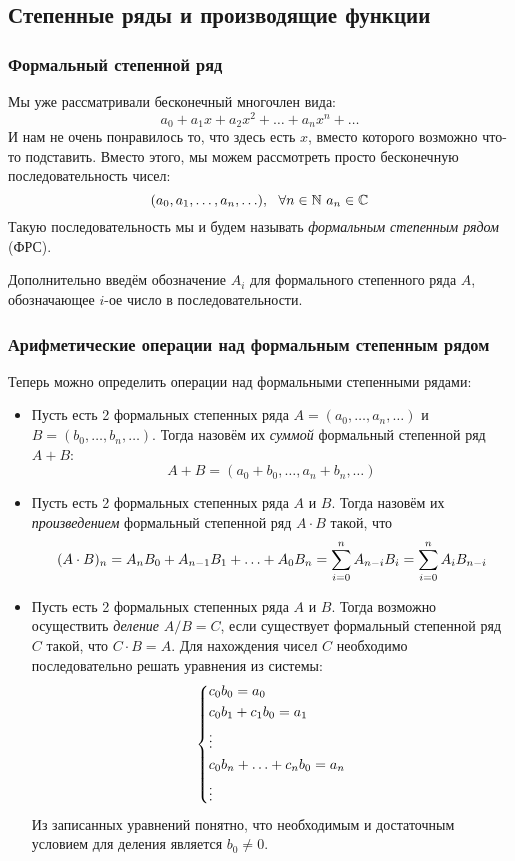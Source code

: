 \subsection{Степенные ряды и производящие функции}

\subsubsection*{Формальный степенной ряд}

\begin{definition}
	Мы уже рассматривали бесконечный многочлен вида:
	\[
		a_0 + a_1 x + a_2 x^2 + \ldots + a_n x^n + \ldots
	\]
	И нам не очень понравилось то, что здесь есть $x$, вместо которого возможно что-то подставить. Вместо этого, мы можем рассмотреть просто бесконечную последовательность чисел:
	\[
		(a_0, a_1, \ldots, a_n, \ldots),\ \ \forall n \in \mathbb{N}\ a_n \in \mathbb{C}
	\]
	Такую последовательность мы и будем называть \textit{формальным степенным рядом} (ФРС).
	
	Дополнительно введём обозначение $A_i$ для формального степенного ряда $A$, обозначающее $i$-ое число в последовательности.
\end{definition}

\subsubsection*{Арифметические операции над формальным степенным рядом}

Теперь можно определить операции над формальными степенными рядами:
\begin{itemize}
	\item Пусть есть 2 формальных степенных ряда $A = (a_0, \ldots, a_n, \ldots)$ и $B = (b_0, \ldots, b_n, \ldots)$. Тогда назовём их \textit{суммой} формальный степенной ряд $A + B$:
	\[
		A + B = (a_0 + b_0, \ldots, a_n + b_n, \ldots)
	\]
	
	\item Пусть есть 2 формальных степенных ряда $A$ и $B$. Тогда назовём их \textit{произведением} формальный степенной ряд $A \cdot B$ такой, что
	\[
		(A \cdot B)_n = A_nB_0 + A_{n - 1}B_{1} + \ldots + A_0B_n = \sum\limits_{i = 0}^n A_{n - i}B_i = \sum\limits_{i = 0}^n A_iB_{n - i}
	\]
	
	\item Пусть есть 2 формальных степенных ряда $A$ и $B$. Тогда возможно осуществить \textit{деление} $A / B = C$, если существует формальный степенной ряд $C$ такой, что $C \cdot B = A$. Для нахождения чисел $C$ необходимо последовательно решать уравнения из системы:
	\[
	\left\{\begin{aligned}
		&{c_0 b_0 = a_0}
		\\
		&{c_0 b_1 + c_1 b_0 = a_1}
		\\
		&\vdots
		\\
		&{c_0 b_n + \ldots + c_n b_0 = a_n}
		\\
		&\vdots
	\end{aligned}\right.
	\]
	Из записанных уравнений понятно, что необходимым и достаточным условием для деления является $b_0 \neq 0$.
\end{itemize}

